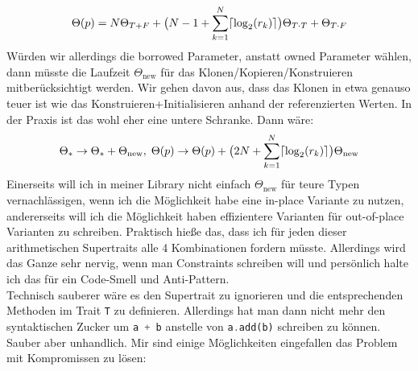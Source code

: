 \documentclass[12pt]{article}
\begin{document}
\begin{align}
\Theta(p) = N\Theta_{T + F} + \big(N - 1 + \sum_{k=1}^N \lceil\log_2(r_k)\rceil\big) \Theta_{T\cdot T} + \Theta_{T\cdot F}
\end{align}
Würden wir allerdings die borrowed Parameter, anstatt owned Parameter wählen, dann müsste die Laufzeit $\Theta_{\text{new}}$ für das Klonen/Kopieren/Konstruieren mitberücksichtigt werden. Wir gehen davon aus, dass das Klonen in etwa genauso teuer ist wie das Konstruieren+Initialisieren anhand der referenzierten Werten. In der Praxis ist das wohl eher eine untere Schranke. Dann wäre:
\begin{align}
\Theta_* \to \Theta_* + \Theta_{\text{new}},\; \Theta(p) \to \Theta(p) + \big(2N + \sum_{k=1}^N \lceil\log_2(r_k)\rceil\big) \Theta_{\text{new}}
\end{align}
Einerseits will ich in meiner Library nicht einfach $\Theta_{\text{new}}$ für teure Typen vernachlässigen, wenn ich die Möglichkeit habe eine in-place Variante zu nutzen, andererseits will ich die Möglichkeit haben effizientere Varianten für out-of-place Varianten zu schreiben. Praktisch hieße das, dass ich für jeden dieser arithmetischen Supertraits alle 4 Kombinationen fordern müsste. Allerdings wird das Ganze sehr nervig, wenn man Constraints schreiben will und persönlich halte ich das für ein Code-Smell und Anti-Pattern.\\
Technisch sauberer wäre es den Supertrait zu ignorieren und die entsprechenden Methoden im Trait \texttt T zu definieren. Allerdings hat man dann nicht mehr den syntaktischen Zucker um \lstinline[language=Rust]|a + b| anstelle von \lstinline[language=Rust]|a.add(b)| schreiben zu können. Sauber aber unhandlich. Mir sind einige Möglichkeiten eingefallen das Problem mit Kompromissen zu lösen:
\end{document}
